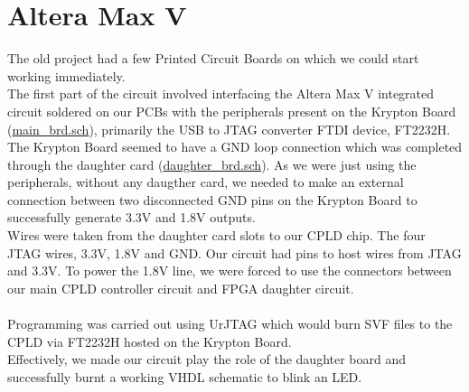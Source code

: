 \documentclass[11pt]{article}
\begin{document}
\section{Altera Max V}

The old project had a few Printed Circuit Boards on which we could start working immediately. \\
The first part of the circuit involved interfacing the Altera Max V integrated circuit soldered on our PCBs with the peripherals present on the Krypton Board (\href{https://github.com/Abhin02/FPGA/blob/master/eagle/Krypton/main_brd.sch}{main\_brd.sch}), primarily the USB to JTAG converter FTDI device, FT2232H.\\
The Krypton Board seemed to have a GND loop connection which was completed through the daughter card (\href{https://github.com/Abhin02/FPGA/blob/master/eagle/Krypton/daughter_brd.sch}{daughter\_brd.sch}). As we were just using the peripherals, without any daugther card, we needed to make an external connection between two disconnected GND pins on the Krypton Board to successfully generate 3.3V and 1.8V outputs.\\
Wires were taken from the daughter card slots to our CPLD chip. The four JTAG wires, 3.3V, 1.8V and GND. Our circuit had pins to host wires from JTAG and 3.3V. To power the 1.8V line, we were forced to use the connectors between our main CPLD controller circuit and FPGA daughter circuit.\\\\ Programming was carried out using UrJTAG which would burn SVF files to the CPLD via FT2232H hosted on the Krypton Board.\\
Effectively, we made our circuit play the role of the daughter board and successfully burnt a working VHDL schematic to blink an LED.\\

 
\end{document}
